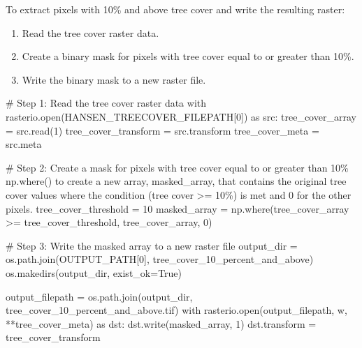 \documentclass[
  letterpaper,
  DIV=11,
  numbers=noendperiod]{scrartcl}
\newenvironment{Shaded}{\begin{snugshade}}{\end{snugshade}}
\newcommand{\BuiltInTok}[1]{\textcolor[rgb]{0.00,0.23,0.31}{#1}}
\newcommand{\CommentTok}[1]{\textcolor[rgb]{0.37,0.37,0.37}{#1}}
\newcommand{\ControlFlowTok}[1]{\textcolor[rgb]{0.00,0.23,0.31}{#1}}
\newcommand{\DecValTok}[1]{\textcolor[rgb]{0.68,0.00,0.00}{#1}}
\newcommand{\ImportTok}[1]{\textcolor[rgb]{0.00,0.46,0.62}{#1}}
\newcommand{\NormalTok}[1]{\textcolor[rgb]{0.00,0.23,0.31}{#1}}
\newcommand{\OperatorTok}[1]{\textcolor[rgb]{0.37,0.37,0.37}{#1}}
\newcommand{\StringTok}[1]{\textcolor[rgb]{0.13,0.47,0.30}{#1}}
\newcommand{\VariableTok}[1]{\textcolor[rgb]{0.07,0.07,0.07}{#1}}
\providecommand{\tightlist}{%
  \setlength{\itemsep}{0pt}\setlength{\parskip}{0pt}}\usepackage{longtable,booktabs,array}
\begin{document}
To extract pixels with 10\% and above tree cover and write the resulting
raster:

\begin{enumerate}
\def\labelenumi{\arabic{enumi}.}
\tightlist
\item
  Read the tree cover raster data.
\item
  Create a binary mask for pixels with tree cover equal to or greater
  than 10\%.
\item
  Write the binary mask to a new raster file.
\end{enumerate}

\begin{Shaded}
\begin{Highlighting}[]
\CommentTok{\# Step 1: Read the tree cover raster data}
\ControlFlowTok{with}\NormalTok{ rasterio.}\BuiltInTok{open}\NormalTok{(HANSEN\_TREECOVER\_FILEPATH[}\DecValTok{0}\NormalTok{]) }\ImportTok{as}\NormalTok{ src:}
\NormalTok{    tree\_cover\_array }\OperatorTok{=}\NormalTok{ src.read(}\DecValTok{1}\NormalTok{)}
\NormalTok{    tree\_cover\_transform }\OperatorTok{=}\NormalTok{ src.transform}
\NormalTok{    tree\_cover\_meta }\OperatorTok{=}\NormalTok{ src.meta}

\CommentTok{\# Step 2: Create a mask for pixels with tree cover equal to or greater than 10\%}
\CommentTok{\textquotesingle{}\textquotesingle{}\textquotesingle{}np.where() to create a new array, masked\_array,}
\CommentTok{that contains the original tree cover values }
\CommentTok{where the condition (tree cover \textgreater{}= 10\%) is met and 0 for the other pixels. \textquotesingle{}\textquotesingle{}\textquotesingle{}}
\NormalTok{tree\_cover\_threshold }\OperatorTok{=} \DecValTok{10}
\NormalTok{masked\_array }\OperatorTok{=}\NormalTok{ np.where(tree\_cover\_array }\OperatorTok{\textgreater{}=}\NormalTok{ tree\_cover\_threshold, tree\_cover\_array, }\DecValTok{0}\NormalTok{)}

\CommentTok{\# Step 3: Write the masked array to a new raster file}
\NormalTok{output\_dir }\OperatorTok{=}\NormalTok{ os.path.join(OUTPUT\_PATH[}\DecValTok{0}\NormalTok{], }\StringTok{\textquotesingle{}tree\_cover\_10\_percent\_and\_above\textquotesingle{}}\NormalTok{)}
\NormalTok{os.makedirs(output\_dir, exist\_ok}\OperatorTok{=}\VariableTok{True}\NormalTok{)}

\NormalTok{output\_filepath }\OperatorTok{=}\NormalTok{ os.path.join(output\_dir, }\StringTok{\textquotesingle{}tree\_cover\_10\_percent\_and\_above.tif\textquotesingle{}}\NormalTok{)}
\ControlFlowTok{with}\NormalTok{ rasterio.}\BuiltInTok{open}\NormalTok{(output\_filepath, }\StringTok{\textquotesingle{}w\textquotesingle{}}\NormalTok{, }\OperatorTok{**}\NormalTok{tree\_cover\_meta) }\ImportTok{as}\NormalTok{ dst:}
\NormalTok{    dst.write(masked\_array, }\DecValTok{1}\NormalTok{)}
\NormalTok{    dst.transform }\OperatorTok{=}\NormalTok{ tree\_cover\_transform}
\end{Highlighting}
\end{Shaded}
\end{document}
